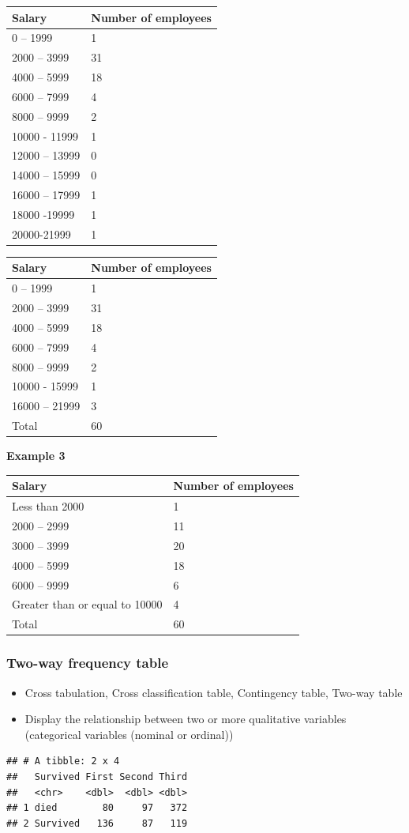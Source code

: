 \documentclass[]{book}
\providecommand{\tightlist}{%
  \setlength{\itemsep}{0pt}\setlength{\parskip}{0pt}}
\begin{document}
\begin{longtable}[]{@{}ll@{}}
\toprule
Salary & Number of employees\tabularnewline
\midrule
\endhead
0 -- 1999 & 1\tabularnewline
2000 -- 3999 & 31\tabularnewline
4000 -- 5999 & 18\tabularnewline
6000 -- 7999 & 4\tabularnewline
8000 -- 9999 & 2\tabularnewline
10000 - 11999 & 1\tabularnewline
12000 -- 13999 & 0\tabularnewline
14000 -- 15999 & 0\tabularnewline
16000 -- 17999 & 1\tabularnewline
18000 -19999 & 1\tabularnewline
20000-21999 & 1\tabularnewline
\bottomrule
\end{longtable}

\begin{longtable}[]{@{}ll@{}}
\toprule
Salary & Number of employees\tabularnewline
\midrule
\endhead
0 -- 1999 & 1\tabularnewline
2000 -- 3999 & 31\tabularnewline
4000 -- 5999 & 18\tabularnewline
6000 -- 7999 & 4\tabularnewline
8000 -- 9999 & 2\tabularnewline
10000 - 15999 & 1\tabularnewline
16000 -- 21999 & 3\tabularnewline
Total & 60\tabularnewline
\bottomrule
\end{longtable}

\textbf{Example 3}

\begin{longtable}[]{@{}ll@{}}
\toprule
Salary & Number of employees\tabularnewline
\midrule
\endhead
Less than 2000 & 1\tabularnewline
2000 -- 2999 & 11\tabularnewline
3000 -- 3999 & 20\tabularnewline
4000 -- 5999 & 18\tabularnewline
6000 -- 9999 & 6\tabularnewline
Greater than or equal to 10000 & 4\tabularnewline
Total & 60\tabularnewline
\bottomrule
\end{longtable}

\hypertarget{two-way-frequency-table}{%
\subsubsection{Two-way frequency table}\label{two-way-frequency-table}}

\begin{itemize}
\tightlist
\item
  Cross tabulation, Cross classification table, Contingency table, Two-way table
\item
  Display the relationship between two or more qualitative variables (categorical variables (nominal or ordinal))
\end{itemize}

\begin{verbatim}
## # A tibble: 2 x 4
##   Survived First Second Third
##   <chr>    <dbl>  <dbl> <dbl>
## 1 died        80     97   372
## 2 Survived   136     87   119
\end{verbatim}
\end{document}
